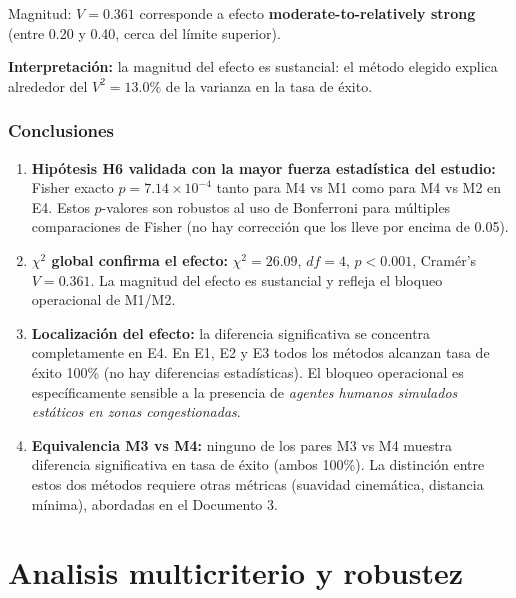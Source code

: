 \documentclass[12pt,a4paper,oneside]{book}
\begin{document}
Magnitud: $V = 0.361$ corresponde a efecto \textbf{moderate-to-relatively strong} (entre 0.20 y 0.40, cerca del límite superior).

\textbf{Interpretación:} la magnitud del efecto es sustancial: el método elegido explica alrededor del $V^2 = 13.0\%$ de la varianza en la tasa de éxito.

\newpage
\section{Conclusiones}

\begin{enumerate}[leftmargin=*]
    \item \textbf{Hipótesis H6 validada con la mayor fuerza estadística del estudio:} Fisher exacto $p = 7.14 \times 10^{-4}$ tanto para M4 vs M1 como para M4 vs M2 en E4. Estos $p$-valores son robustos al uso de Bonferroni para múltiples comparaciones de Fisher (no hay corrección que los lleve por encima de 0.05).
    
    \item \textbf{$\chi^2$ global confirma el efecto:} $\chi^2 = 26.09$, $df = 4$, $p < 0.001$, Cramér's $V = 0.361$. La magnitud del efecto es sustancial y refleja el bloqueo operacional de M1/M2.
    
    \item \textbf{Localización del efecto:} la diferencia significativa se concentra completamente en E4. En E1, E2 y E3 todos los métodos alcanzan tasa de éxito 100\% (no hay diferencias estadísticas). El bloqueo operacional es específicamente sensible a la presencia de \emph{agentes humanos simulados estáticos en zonas congestionadas}.
    
    \item \textbf{Equivalencia M3 vs M4:} ninguno de los pares M3 vs M4 muestra diferencia significativa en tasa de éxito (ambos 100\%). La distinción entre estos dos métodos requiere otras métricas (suavidad cinemática, distancia mínima), abordadas en el Documento 3.
\end{enumerate}



\part{Analisis multicriterio y robustez}
\end{document}
